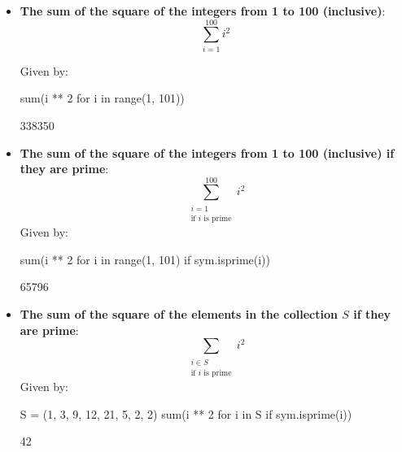 \begin{itemize}
\item 
\textbf{The sum of the square of the integers from 1 to 100 (inclusive)}:
        \[\sum_{i=1}^{100}i ^2\]

        Given by:

\begin{pyin}
sum(i ** 2 for i in range(1, 101))
\end{pyin}

\begin{raw}
338350
\end{raw}

\item
\textbf{The sum of the square of the integers from 1 to 100 (inclusive) if they
are prime}:
\[\sum_{\begin{array}{c}i=1\\\text{if }i\text{ is prime}\end{array}}^{100}i ^2\]
    Given by:
\begin{pyin}
sum(i ** 2 for i in range(1, 101) if sym.isprime(i))
\end{pyin}

\begin{raw}
65796
\end{raw}

\item 
\textbf{The sum of the square of the elements in the collection $S$ if they are
prime}:
\[\sum_{\begin{array}{c}i\in{S}\\\text{if }i\text{ is prime}\end{array}}i ^2\]
Given by:
\begin{pyin}
S = (1, 3, 9, 12, 21, 5, 2, 2)
sum(i ** 2 for i in S if sym.isprime(i))
\end{pyin}

\begin{raw}
42
\end{raw}
\end{itemize}
